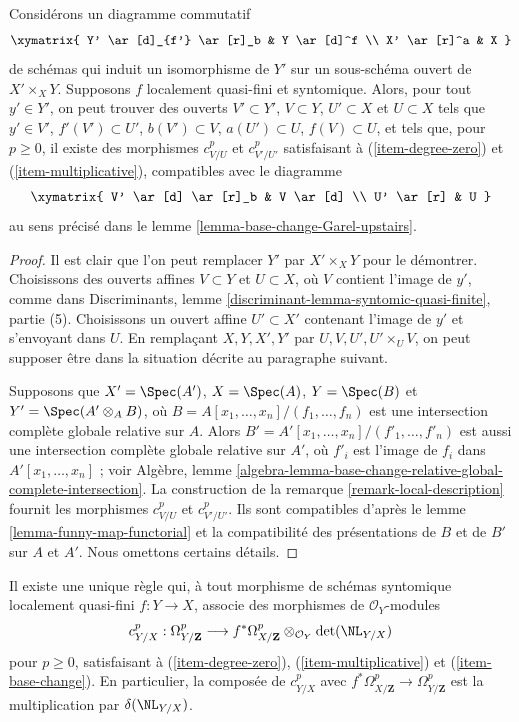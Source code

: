 \begin{lemma}
\label{lemma-existence-base-change-Garel-upstairs}
Considérons un diagramme commutatif
$$
\xymatrix{
Y' \ar[d]_{f'} \ar[r]_b & Y \ar[d]^f \\
X' \ar[r]^a & X
}
$$
de schémas qui induit un isomorphisme de $Y'$ sur un sous-schéma ouvert de
$X' \times_X Y$. Supposons $f$ localement quasi-fini et syntomique. Alors, pour
tout $y' \in Y'$, on peut trouver des ouverts $V' \subset Y'$,
$V \subset Y$, $U' \subset X$ et $U \subset X$ tels que $y' \in V'$,
$f'(V') \subset U'$, $b(V') \subset V$, $a(U') \subset U$,
$f(V) \subset U$, et tels que, pour $p \geq 0$, il existe des morphismes
$c^p_{V/U}$ et $c^p_{V'/U'}$ satisfaisant à (\ref{item-degree-zero})
et (\ref{item-multiplicative}), compatibles avec le diagramme
$$
\xymatrix{
V' \ar[d] \ar[r]_b & V \ar[d] \\
U' \ar[r] & U
}
$$
au sens précisé dans le lemme \ref{lemma-base-change-Garel-upstairs}.
\end{lemma}

\begin{proof}
Il est clair que l'on peut remplacer $Y'$ par $X' \times_X Y$ pour le démontrer.
Choisissons des ouverts affines $V \subset Y$ et $U \subset X$, où $V$ contient
l'image de $y'$, comme dans
Discriminants, lemme \ref{discriminant-lemma-syntomic-quasi-finite}, partie (5).
Choisissons un ouvert affine $U' \subset X'$ contenant l'image de $y'$
et s'envoyant dans $U$. En remplaçant $X, Y, X', Y'$ par
$U, V, U', U' \times_U V$, on peut supposer être dans la situation
décrite au paragraphe suivant.

\medskip\noindent
Supposons que $X' = \Spec(A')$, $X = \Spec(A)$, $Y = \Spec(B)$ et
$Y' = \Spec(A' \otimes_A B)$, où $B = A[x_1, \ldots, x_n]/(f_1, \ldots, f_n)$
est une intersection complète globale relative sur $A$. Alors
$B' = A'[x_1, \ldots, x_n]/(f'_1, \ldots, f'_n)$ est aussi une intersection
complète globale relative sur $A'$, où $f'_i$ est l'image de $f_i$
dans $A'[x_1, \ldots, x_n]$ ; voir Algèbre, lemme
\ref{algebra-lemma-base-change-relative-global-complete-intersection}.
La construction de la remarque \ref{remark-local-description}
fournit les morphismes $c^p_{V/U}$ et $c^p_{V'/U'}$.
Ils sont compatibles d'après le lemme \ref{lemma-funny-map-functorial}
et la compatibilité des présentations de $B$ et de $B'$ sur
$A$ et $A'$. Nous omettons certains détails.
\end{proof}

\begin{lemma}
\label{lemma-Garel-upstairs}
Il existe une unique règle qui, à tout morphisme de schémas syntomique
localement quasi-fini $f : Y \to X$, associe des morphismes de $\mathcal{O}_Y$-modules
$$
c^p_{Y/X} :
\Omega^p_{Y/\mathbf{Z}}
\longrightarrow
f^*\Omega^p_{X/\mathbf{Z}} \otimes_{\mathcal{O}_Y} \det(\NL_{Y/X})
$$
pour $p \geq 0$, satisfaisant à (\ref{item-degree-zero}), (\ref{item-multiplicative})
et (\ref{item-base-change}). En particulier, la composée de
$c^p_{Y/X}$ avec $f^*\Omega^p_{X/\mathbf{Z}} \to \Omega^p_{Y/\mathbf{Z}}$
est la multiplication par $\delta(\NL_{Y/X})$.
\end{lemma}

